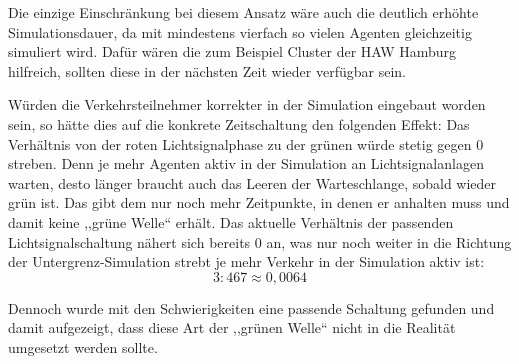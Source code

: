 Die einzige Einschränkung bei diesem Ansatz wäre auch die deutlich erhöhte Simulationsdauer, da mit mindestens vierfach so vielen Agenten gleichzeitig simuliert wird.
Dafür wären die zum Beispiel Cluster der HAW Hamburg hilfreich, sollten diese in der nächsten Zeit wieder verfügbar sein.

Würden die Verkehrsteilnehmer korrekter in der Simulation eingebaut worden sein, so hätte dies auf die konkrete Zeitschaltung den folgenden Effekt:
Das Verhältnis von der roten Lichtsignalphase zu der grünen würde stetig gegen 0 streben.
Denn je mehr Agenten aktiv in der Simulation an Lichtsignalanlagen warten, desto länger braucht auch das Leeren der Warteschlange, sobald wieder grün ist.
Das gibt dem  nur noch mehr Zeitpunkte, in denen er anhalten muss und damit keine ,,grüne Welle`` erhält.
Das aktuelle Verhältnis der passenden Lichtsignalschaltung nähert sich bereits 0 an, was nur noch weiter in die Richtung der Untergrenz-Simulation strebt je mehr Verkehr in der Simulation aktiv ist:
\[3 : 467 \approx 0,0064\]

Dennoch wurde mit den Schwierigkeiten eine passende Schaltung gefunden und damit aufgezeigt, dass diese Art der ,,grünen Welle`` nicht in die Realität umgesetzt werden sollte.
